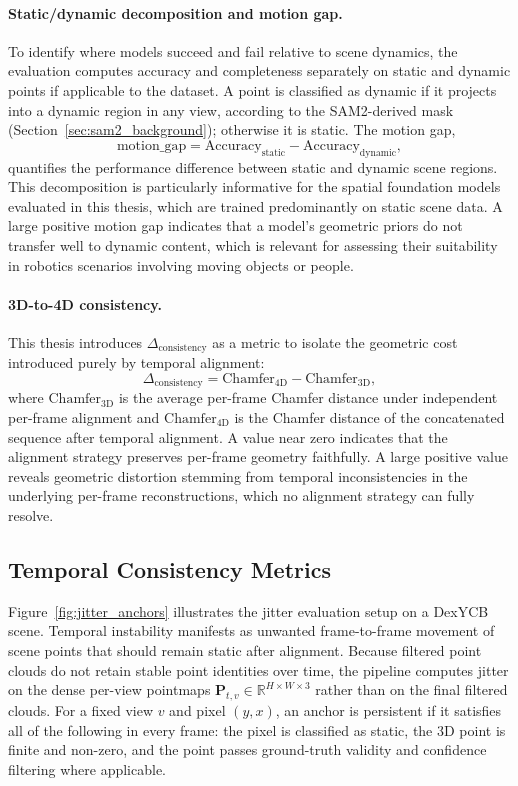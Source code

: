 \paragraph{Static/dynamic decomposition and motion gap.}
To identify where models succeed and fail relative to scene dynamics, the
evaluation computes accuracy and completeness separately on static and dynamic
points if applicable to the dataset. A point is classified as dynamic if it projects into a dynamic region
in any view, according to the SAM2-derived mask
(Section~\ref{sec:sam2_background}); otherwise it is static. The motion gap,
\begin{equation}
\text{motion\_gap} = \text{Accuracy}_{\text{static}} - \text{Accuracy}_{\text{dynamic}},
\end{equation}
quantifies the performance difference between static and dynamic scene regions.
This decomposition is particularly informative for the spatial foundation models
evaluated in this thesis, which are
trained predominantly on static scene data. A large positive motion gap indicates
that a model's geometric priors do not transfer well to dynamic content, which is
relevant for assessing their suitability in robotics scenarios involving moving
objects or people.

\paragraph{3D-to-4D consistency.}
This thesis introduces $\Delta_{\text{consistency}}$ as a metric to isolate the
geometric cost introduced purely by temporal alignment:
\begin{equation}
\Delta_{\text{consistency}} = \mathrm{Chamfer}_{\mathrm{4D}} - \mathrm{Chamfer}_{\mathrm{3D}},
\end{equation}
where $\mathrm{Chamfer}_{\mathrm{3D}}$ is the average per-frame Chamfer distance
under independent per-frame alignment and $\mathrm{Chamfer}_{\mathrm{4D}}$ is
the Chamfer distance of the concatenated sequence after temporal alignment. A value near zero indicates that the alignment strategy preserves per-frame
geometry faithfully. A large positive value reveals geometric distortion
stemming from temporal inconsistencies in the underlying per-frame
reconstructions, which no alignment strategy can fully resolve.

\subsection{Temporal Consistency Metrics}
Figure~\ref{fig:jitter_anchors} illustrates the jitter evaluation setup on a 
DexYCB scene. Temporal instability manifests as unwanted frame-to-frame 
movement of scene points that should remain static after alignment. Because 
filtered point clouds do not retain stable point identities over time, the 
pipeline computes jitter on the dense per-view pointmaps 
$\mathbf{P}_{t,v} \in \mathbb{R}^{H \times W \times 3}$ rather than on the 
final filtered clouds. For a fixed view $v$ and pixel $(y,x)$, an anchor is persistent if it satisfies all of the following in every frame: the pixel is classified as static, the 3D point is finite and non-zero, and the point passes ground-truth validity and confidence filtering where applicable.

